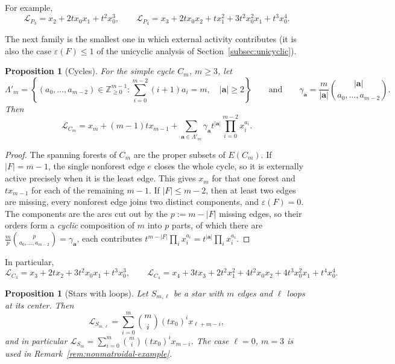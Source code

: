 \documentclass[11pt]{article}
\theoremstyle{plain}
\newtheorem{proposition}[theorem]{Proposition}
\theoremstyle{definition}
\renewcommand{\mathcal}{\mathscr}
\newcommand{\ds}{\displaystyle}
\newcommand{\LL}{\mathcal{L}}    %
\newcommand{\ba}{\mathbf{a}}
\newcommand{\eps}{\varepsilon}
\newcommand{\ZZ}{\mathbb Z}
\numberwithin{equation}{section}
\begin{document}
For example,
  \begin{equation}
    \label{eq:path4}
 \LL_{P_3}=x_2+2tx_0x_1+t^2x_0^3,
 \qquad
 \LL_{P_4}=x_3+2t x_0x_2+t x_1^2+3t^2x_0^2x_1+t^3x_0^4.
\end{equation}

The next family is the smallest one in which external activity contributes (it is also the case $\eps(F)\le1$ of the unicyclic analysis of
Section~\ref{subsec:unicyclic}).

\begin{proposition}[Cycles]\label{prop:cycle}
For the simple cycle $C_m$, $m\ge 3$, let
\[
 \Lambda'_m = \left\{(a_0,\ldots,a_{m-2})\in\ZZ_{\ge 0}^{m-1}:
 \sum_{i=0}^{m-2}(i+1)a_i=m,\quad |\ba|\ge 2\right\}
\qquad \text{and} \qquad
 \gamma_{\ba}=\frac{m}{|\ba|}
 \binom{|\ba|}{a_0,\ldots,a_{m-2}}.
\]
Then
\begin{equation}\label{eq:circle}
 \LL_{C_m}=x_m+(m-1)tx_{m-1}
 +\sum_{\ba\in\Lambda'_m}\gamma_{\ba}t^{|\ba|}
 \prod_{i=0}^{m-2}x_i^{a_i}.
\end{equation}
\end{proposition}

\begin{proof}
The spanning forests of $C_m$ are the proper subsets of $E(C_m)$.  If
$|F|=m-1$, the single nonforest edge $e$ closes the whole cycle, so it is
externally active precisely when it is the least edge.  This gives $x_m$ for
that one forest and $tx_{m-1}$ for each of the remaining $m-1$.  If
$|F|\le m-2$, then at least two edges are missing, every nonforest edge joins
two distinct components, and $\eps(F)=0$.  The components are the arcs
cut out by the $p:=m-|F|$ missing edges, so their orders form a \emph{cyclic}
composition of $m$ into $p$ parts, of which there are
$\ds \frac mp \binom{p}{a_0,\ldots,a_{m-2}} = \gamma_{\ba}$, each contributes
$t^{m-|F|}\prod_i x_i^{a_i}=t^{|\ba|}\prod_i x_i^{a_i}$.
\end{proof}

In particular,
\[ \LL_{C_3}=x_3+2tx_2+3t^2x_0x_1+t^3x_0^3,
 \qquad
 \LL_{C_4}=x_4+3tx_3+2t^2x_1^2+4t^2x_0x_2
 +4t^3x_0^2x_1+t^4x_0^4.
\]

\begin{proposition}[Stars with loops]\label{prop:star}
Let $S_{m,\ell}$ be a star with $m$ edges and $\ell$ loops at its center.
Then
\begin{equation}\label{eq:star}
\ds \LL_{S_{m,\ell}}=
 \sum_{i=0}^{m}\binom mi(tx_0)^i x_{\ell+m-i},
\end{equation}
and in particular $\ds \LL_{S_m}=\sum_{i=0}^{m}\binom mi(tx_0)^i x_{m-i}$.
The case $\ell=0$, $m=3$ is used in Remark~\ref{rem:nonmatroidal-example}.
\end{proposition}
\end{document}
